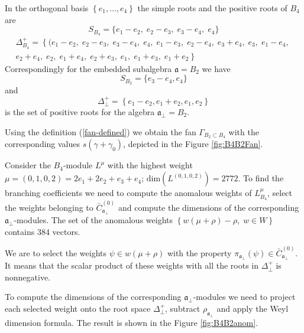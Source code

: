 \documentclass[12pt]{iopart}
\theoremstyle{definition}
\begin{document}
In the orthogonal basis $\left\{e_1,\dots,e_4\right\}$ the simple roots and the positive roots of $B_4$ are
\begin{equation*}
  \label{eq:8}
 S_{B_4}= \{e_1 - e_2,\; e_2 - e_3,\; e_3 - e_4,\; e_4\}
\end{equation*}
\begin{eqnarray*}
  \label{eq:19}
 \Delta^+_{B_4}=\left\{ (e_1 - e_2,\; e_2 - e_3,\; e_3 - e_4,\; e_4,\; e_1 - e_3,\; e_2 - e_4,\; e_3 + e_4,\; e_3,\; e_1 - e_4,\;\right.\\
 \left. e_2 + e_4,\; e_2,\; e_1 + e_4,\; e_2 + e_3,\; e_1,\; e_1 + e_3,\; e_1 + e_2\right\}
\end{eqnarray*}
Correspondingly for the embedded subalgebra $\mathfrak{a}=B_2$ we have
\begin{equation*}
  \label{eq:26}
 S_{B_2}=\{e_3-e_4,e_4\}
\end{equation*}
and
\begin{equation*}
  \label{eq:27}
 \Delta^{+}_{\bot}= \left\{e_1-e_2,e_1+e_2,e_1,e_2\right\}
\end{equation*}
is the set of positive roots for the algebra $\mathfrak{a}_{\bot}=B_2$.

Using the definition (\ref{fan-defined}) we obtain the fan
$\Gamma_{B_2\subset B_4}$ with the corresponding values $s(\gamma+\gamma_0)$,
depicted in the Figure \ref{fig:B4B2Fan}.


Consider the $B_4$-module $L^{\mu}$ with the highest weight $\mu=(0,1,0,2)=2
e_1 + 2 e_2 + e_3 + e_4$; $\mathrm{dim}(L^{(0,1,0,2)})=2772$.
To find the branching coefficients we need to compute the anomalous weights of
$L^{\mu}_{B_4}$, select the weights belonging to $\bar{C}^{\left( 0 \right)}_{\mathfrak{a}_{\bot}}$
and compute the dimensions of the corresponding $\mathfrak{a}_{\bot}$-modules.
The set of the anomalous weights $\left\{ w(\mu+\rho)-\rho,\; w\in W\right\}$
contains 384 vectors.

We are to select the weights $\psi \in w(\mu+\rho)$  with the property
$\pi_{\mathfrak{a}_{\bot}} \left(  \psi \right) \in \bar{C}^{\left( 0 \right)}_{\mathfrak{a}_{\bot}}$.
It means that the scalar product of these weights with all the roots in $\Delta^{+}_{\bot}$ is nonnegative.

To compute the dimensions of the corresponding
$\mathfrak{a}_{\bot}$-modules we need to project each selected weight
onto the root space $\Delta^{+}_{\bot}$, subtract
$\rho_{\mathfrak{a}_{\bot}}$ and apply the Weyl dimension formula. The result is shown in the Figure \ref{fig:B4B2anom}.
\end{document}
